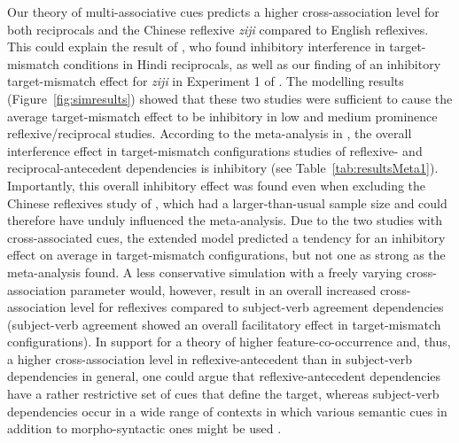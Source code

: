\documentclass{cambridge7A}\usepackage[]{graphicx}\usepackage[]{color}
\begin{document}
Our theory of  multi-associative cues predicts a higher cross-association level for both reciprocals and the Chinese reflexive \textit{ziji} compared to English reflexives. This could explain the result of \cite{KushPhillips2014}, who found inhibitory interference in target-mismatch conditions in Hindi reciprocals, as well as our finding of an inhibitory target-mismatch effect for \textit{ziji} in Experiment 1 of \cite{JaegerEngelmannVasishth2015}.
The modelling results (Figure~\ref{fig:simresults}) showed that these two studies were sufficient to cause the average target-mismatch effect to be inhibitory in low and medium prominence reflexive/reciprocal studies. According to the meta-analysis in \cite{JaegerEngelmannVasishth2017}, the overall interference effect in target-mismatch configurations studies of reflexive- and reciprocal-antecedent dependencies is inhibitory  (see Table~\ref{tab:resultsMeta1}). Importantly, this overall inhibitory effect was found even when excluding the Chinese reflexives study of \cite{JaegerEngelmannVasishth2015}, which had a larger-than-usual sample size and could therefore have unduly influenced the meta-analysis.
Due to the two studies with cross-associated cues, the extended model predicted a tendency for an inhibitory effect on average in target-mismatch configurations, but not one as strong  as the meta-analysis found. 
A less conservative simulation with a freely varying cross-association parameter would, however, result in an overall increased cross-association level for reflexives compared to subject-verb agreement dependencies (subject-verb agreement showed an overall facilitatory effect in target-mismatch configurations).
In support for a theory of higher feature-co-occurrence and, thus, a higher cross-association level in reflexive-antecedent than in subject-verb dependencies in general, one could argue that reflexive-antecedent dependencies have a rather restrictive set of cues that define the target, whereas subject-verb dependencies occur in a wide range of contexts in which various semantic cues in addition to morpho-syntactic ones might be used \citep[cf.][]{VanDyke2006}.
\end{document}
